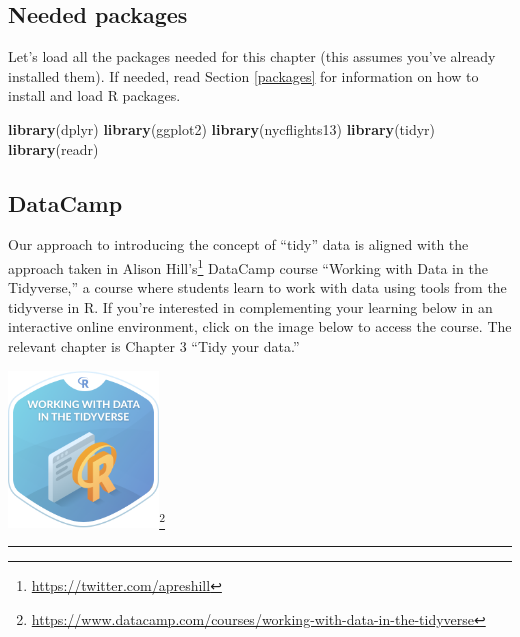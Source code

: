 \documentclass[12pt,]{krantz}
\makeatletter
\newenvironment{Shaded}{\begin{snugshade}}{\end{snugshade}}
\newcommand{\KeywordTok}[1]{\textcolor[rgb]{0.27,0.27,0.27}{\textbf{#1}}}
\newcommand{\NormalTok}[1]{#1}
\renewcommand{\href}[2]{#2\footnote{\url{#1}}}
\newenvironment{kframe}{%
\medskip{}
\setlength{\fboxsep}{.8em}
 \def\at@end@of@kframe{}%
 \ifinner\ifhmode%
  \def\at@end@of@kframe{\end{minipage}}%
  \begin{minipage}{\columnwidth}%
 \fi\fi%
 \def\FrameCommand##1{\hskip\@totalleftmargin \hskip-\fboxsep
 \colorbox{shadecolor}{##1}\hskip-\fboxsep
     \hskip-\linewidth \hskip-\@totalleftmargin \hskip\columnwidth}%
 \MakeFramed {\advance\hsize-\width
   \@totalleftmargin\z@ \linewidth\hsize
   \@setminipage}}%
 {\par\unskip\endMakeFramed%
 \at@end@of@kframe}
\renewenvironment{Shaded}{\begin{kframe}}{\end{kframe}}
\theoremstyle{definition}
\theoremstyle{definition}
\theoremstyle{definition}
\theoremstyle{remark}
\makeatother
\begin{document}
\subsection*{Needed packages}\label{needed-packages-1}


Let's load all the packages needed for this chapter (this assumes you've
already installed them). If needed, read Section \ref{packages} for
information on how to install and load R packages.

\begin{Shaded}
\begin{Highlighting}[]
\KeywordTok{library}\NormalTok{(dplyr)}
\KeywordTok{library}\NormalTok{(ggplot2)}
\KeywordTok{library}\NormalTok{(nycflights13)}
\KeywordTok{library}\NormalTok{(tidyr)}
\KeywordTok{library}\NormalTok{(readr)}
\end{Highlighting}
\end{Shaded}

\subsection*{DataCamp}\label{datacamp-1}


Our approach to introducing the concept of ``tidy'' data is aligned with
the approach taken in \href{https://twitter.com/apreshill}{Alison
Hill's} DataCamp course ``Working with Data in the Tidyverse,'' a course
where students learn to work with data using tools from the tidyverse in
R. If you're interested in complementing your learning below in an
interactive online environment, click on the image below to access the
course. The relevant chapter is Chapter 3 ``Tidy your data.''

\begin{center}
\href{https://www.datacamp.com/courses/working-with-data-in-the-tidyverse}{\includegraphics[width=0.3\textwidth]{images/datacamp_working_with_data.png}}
\end{center}

\begin{center}\rule{0.5\linewidth}{\linethickness}\end{center}
\end{document}
